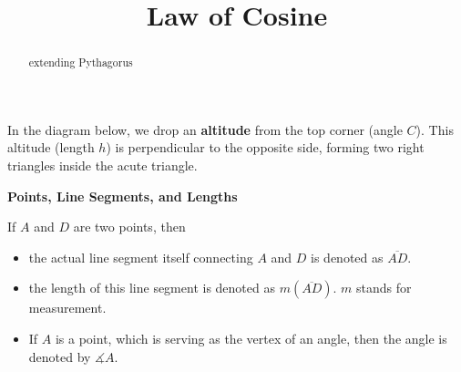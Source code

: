 \documentclass{ximera}
\title{Law of Cosine}
\begin{document}
\begin{abstract}
extending Pythagorus
\end{abstract}
\maketitle







In the diagram below, we drop an \textbf{altitude} from the top corner (angle $C$). This altitude (length $h$) is perpendicular to the opposite side, forming two right triangles inside the acute triangle. 




\begin{image}[3in]
  \end{image}




\begin{notation} \textbf{\textcolor{red!50!green}{Points, Line Segments, and Lengths}}  

If $A$ and $D$ are two points, then 

\begin{itemize}
\item the actual line segment itself connecting $A$ and $D$ is denoted as $\overline{AD}$. 
\item the length of this line segment is denoted as $m(\overline{AD})$.  $m$ stands for measurement.
\item If $A$ is a point, which is serving as the vertex of an angle, then the angle is denoted by $\measuredangle A$.
\end{itemize}
\end{notation}
\end{document}
